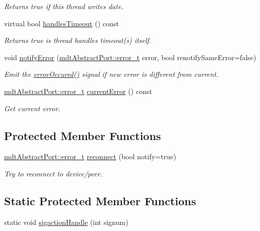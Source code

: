 \begin{DoxyCompactItemize}
\begin{DoxyCompactList}\small\item\em Returns true if this thread writes date. \end{DoxyCompactList}\item 
virtual bool \hyperlink{classmdt_port_thread_aaf671b84f7c1fb508ff9221dccee4c15}{handles\-Timeout} () const 
\begin{DoxyCompactList}\small\item\em Returns true is thread handles timeout(s) itself. \end{DoxyCompactList}\item 
void \hyperlink{classmdt_port_thread_a30bdd11ef16d4f3321921c9d9b26399d}{notify\-Error} (\hyperlink{classmdt_abstract_port_ad4121bb930c95887e77f8bafa065a85e}{mdt\-Abstract\-Port\-::error\-\_\-t} error, bool renotify\-Same\-Error=false)
\begin{DoxyCompactList}\small\item\em Emit the \hyperlink{classmdt_port_thread_ab31cbe1a85aa830cd368654d1f806326}{error\-Occured()} signal if new error is different from current. \end{DoxyCompactList}\item 
\hyperlink{classmdt_abstract_port_ad4121bb930c95887e77f8bafa065a85e}{mdt\-Abstract\-Port\-::error\-\_\-t} \hyperlink{classmdt_port_thread_adbc2d86162c23401e75184407b8c9428}{current\-Error} () const 
\begin{DoxyCompactList}\small\item\em Get current error. \end{DoxyCompactList}\end{DoxyCompactItemize}
\subsection*{Protected Member Functions}
\begin{DoxyCompactItemize}
\item 
\hyperlink{classmdt_abstract_port_ad4121bb930c95887e77f8bafa065a85e}{mdt\-Abstract\-Port\-::error\-\_\-t} \hyperlink{classmdt_port_thread_abee1d2f9b67ca37cfd13e108ca978b36}{reconnect} (bool notify=true)
\begin{DoxyCompactList}\small\item\em Try to reconnect to device/peer. \end{DoxyCompactList}\end{DoxyCompactItemize}
\subsection*{Static Protected Member Functions}
\begin{DoxyCompactItemize}
\item 
static void \hyperlink{classmdt_port_thread_a01d2362e0dfcece4cba242cb586d8d1c}{sigaction\-Handle} (int signum)
\end{DoxyCompactItemize}
